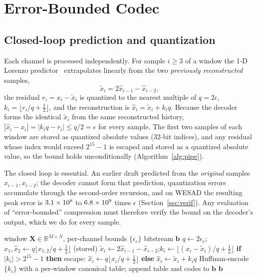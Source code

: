 \documentclass[journal,twoside,web]{ieeecolor}
\begin{document}
\section{Error-Bounded Codec}
\label{sec:codec}
\subsection{Closed-loop prediction and quantization}
Each channel is processed independently. For sample $i\ge3$ of a window the 1-D Lorenzo predictor~\cite{ibarria2003} extrapolates linearly from the two \emph{previously reconstructed} samples,
\begin{equation}
\tilde{x}_i = 2\hat{x}_{i-1}-\hat{x}_{i-2},
\label{eq:lorenzo}
\end{equation}
the residual $r_i=x_i-\tilde{x}_i$ is quantized to the nearest multiple of $q=2\epsilon$, $k_i=\lfloor r_i/q+\tfrac12\rfloor$, and the reconstruction is $\hat{x}_i=\tilde{x}_i+k_iq$. Because the decoder forms the identical $\tilde{x}_i$ from the same reconstructed history, $|\hat{x}_i-x_i|=|k_iq-r_i|\le q/2=\epsilon$ for every sample. The first two samples of each window are stored as quantized absolute values (32-bit indices), and any residual whose index would exceed $2^{15}-1$ is escaped and stored as a quantized absolute value, so the bound holds unconditionally (Algorithm~\ref{alg:pipe}).

The closed loop is essential. An earlier draft predicted from the \emph{original} samples $x_{i-1},x_{i-2}$; the decoder cannot form that prediction, quantization errors accumulate through the second-order recursion, and on WESAD the resulting peak error is $3.1\times10^{8}$ to $6.8\times10^{9}$ times $\epsilon$ (Section~\ref{sec:verif}). Any evaluation of ``error-bounded'' compression must therefore verify the bound on the decoder's output, which we do for every sample.

\begin{algorithm}[t]
\caption{On-device compression of one transmit window}
\label{alg:pipe}
\begin{algorithmic}[1]
\REQUIRE window $\mathbf{X}\in\mathbb{R}^{M\times N}$, per-channel bounds $\{\epsilon_c\}$
\ENSURE bitstream $\mathbf{b}$
  \STATE $q\leftarrow 2\epsilon_c$; \quad $\hat{x}_1,\hat{x}_2\leftarrow q\lfloor x_{1,2}/q+\tfrac12\rfloor$ (stored)
    \STATE $\tilde{x}_i\leftarrow 2\hat{x}_{i-1}-\hat{x}_{i-2}$;\quad $k_i\leftarrow\lfloor(x_i-\tilde{x}_i)/q+\tfrac12\rfloor$
    \STATE \textbf{if} $|k_i|>2^{15}-1$ \textbf{then} escape: $\hat{x}_i\leftarrow q\lfloor x_i/q+\tfrac12\rfloor$ \textbf{else} $\hat{x}_i\leftarrow\tilde{x}_i+k_iq$
  \ENDFOR
  \STATE Huffman-encode $\{k_i\}$ with a per-window canonical table; append table and codes to $\mathbf{b}$
\ENDFOR
\RETURN $\mathbf{b}$
\end{algorithmic}
\end{algorithm}
\end{document}
